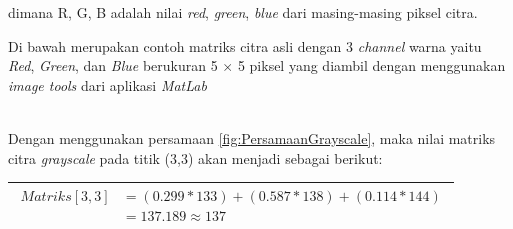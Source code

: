 \noindent dimana R, G, B adalah nilai \textit{red}, \textit{green}, \textit{blue} dari masing-masing piksel citra.

\noindent Di bawah merupakan contoh matriks citra asli dengan 3 \textit{channel} warna yaitu \textit{Red}, \textit{Green}, dan \textit{Blue} berukuran 5 $\times$ 5 piksel yang diambil dengan menggunakan \textit{image tools} dari aplikasi \textit{MatLab} \\

\begin{adjustbox}{width=1\textwidth}
	\noindent\begin{minipage}{\linewidth}
		\label{fig:MatriksCitraAsal}
	\end{minipage}
\end{adjustbox} \\

\noindent Dengan menggunakan persamaan \ref{fig:PersamaanGrayscale}, maka nilai matriks citra \textit{grayscale} pada titik (3,3) akan menjadi sebagai berikut:
\begin{table}[H]
	\begin{adjustbox}{width=1\textwidth}
		\begin{tabular}{|p{13.55cm}|}
			\hline
			\begin{equation}\nonumber
			\begin{aligned}
			Matriks[3,3] &= (0.299 * 133) + (0.587 * 138) + (0.114 * 144) \\
						 &= 137.189 \approx 137 
			\end{aligned}
			\end{equation}\\
			\hline
		\end{tabular}
	\end{adjustbox}
\end{table}

